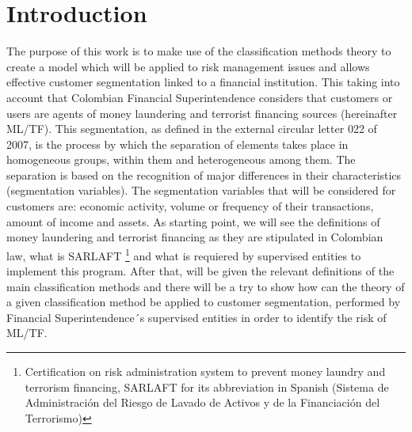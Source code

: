 \chapter{Introduction}
\label{chap:Introduction}
The purpose of this work is to make use of the classification methods theory to create a model which will be applied to risk management issues and allows effective customer segmentation linked to a financial institution. This taking into account that Colombian Financial Superintendence considers that customers or users are agents of money laundering and terrorist financing sources (hereinafter ML/TF). This segmentation, as defined in the external circular letter 022 of 2007, is the process by which the separation of elements takes place in homogeneous groups, within them and heterogeneous among them.
The separation is based on the recognition of major differences in their characteristics (segmentation variables). The segmentation variables that will be considered for customers are: economic activity, volume or frequency of their transactions, amount of income and assets.
As starting point, we will see the definitions of money laundering and terrorist financing as they are stipulated in Colombian law, what is SARLAFT \footnote{Certification on risk administration system to prevent money laundry and terrorism financing, SARLAFT  for  its abbreviation in Spanish (Sistema de Administración del Riesgo de Lavado de Activos y de la Financiación del Terrorismo)}   and what is requiered by supervised entities to implement this program. After that, will be given the relevant definitions of the main classification methods and there will be a try to show how can the theory of a given classification method be applied to customer segmentation, performed by Financial Superintendence´s supervised entities in order to identify the risk of ML/TF.

